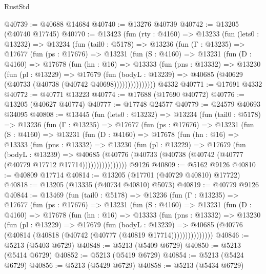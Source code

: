 \begin{lexlean}{RustStd}
\begin{coremodule}
@40739 := @40688 @14684
@40740 := @13276 @40739
@40742 := @13205 (@40740 @17745)
@40770 := @13423
    (fun (rty : @4160) =>
    @13233
      (fun (lets0 : @13232) =>
      @13234
        (fun (tail0 : @5178) =>
        @13236
          (fun (Γ : @13235) =>
          @17677
            (fun (ps : @17676) =>
            @13231
              (fun (S : @4160) =>
              @13231
                (fun (D : @4160) =>
                @17678
                  (fun (hn : @16) =>
                  @13333
                    (fun (pns : @13332) =>
                    @13230
                      (fun (pl : @13229) =>
                      @17679
                        (fun (bodyL : @13239) =>
                        @40685 (@40629 (@40733 (@40738 (@40742 @40698)))))))))))))))
    @4332
@40771 := @17691 @4332
@40772 := @40771 @13223
@40774 := @17688 (@17690 @40772)
@40776 := @13205 (@40627 @40774)
@40777 := @17748 @24577
@40779 := @24579 @40693 @34095
@40808 := @13445
    (fun (lets0 : @13232) =>
    @13234
      (fun (tail0 : @5178) =>
      @13236
        (fun (Γ : @13235) =>
        @17677
          (fun (ps : @17676) =>
          @13231
            (fun (S : @4160) =>
            @13231
              (fun (D : @4160) =>
              @17678
                (fun (hn : @16) =>
                @13333
                  (fun (pns : @13332) =>
                  @13230
                    (fun (pl : @13229) =>
                    @17679
                      (fun (bodyL : @13239) =>
                      @40685
                        (@40776
                          (@40733 (@40738 (@40742 (@40777 (@40779 @17712 @17714))))))))))))))))
    @9126
@40809 := @5162 @9126
@40810 := @40809 @17714
@40814 := @13205 (@17701 (@40729 @40810) @17722)
@40818 := @13205 (@13335 (@40734 @40810) @5073)
@40819 := @40779 @9126
@40844 := @13469
    (fun (tail0 : @5178) =>
    @13236
      (fun (Γ : @13235) =>
      @17677
        (fun (ps : @17676) =>
        @13231
          (fun (S : @4160) =>
          @13231
            (fun (D : @4160) =>
            @17678
              (fun (hn : @16) =>
              @13333
                (fun (pns : @13332) =>
                @13230
                  (fun (pl : @13229) =>
                  @17679
                    (fun (bodyL : @13239) =>
                    @40685 (@40776 (@40814 (@40818 (@40742 (@40777 (@40819 @17714)))))))))))))))
@40846 := @5213 (@5403 @6729)
@40848 := @5213 (@5409 @6729)
@40850 := @5213 (@5414 @6729)
@40852 := @5213 (@5419 @6729)
@40854 := @5213 (@5424 @6729)
@40856 := @5213 (@5429 @6729)
@40858 := @5213 (@5434 @6729)

\end{coremodule}
\end{lexlean}
